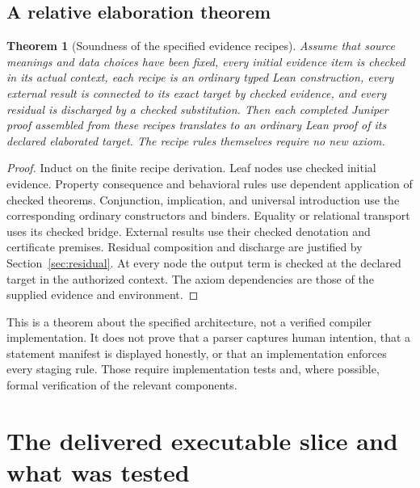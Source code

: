 \documentclass[11pt,a4paper]{article}
\newtheorem{theorem}{Theorem}[section]
\theoremstyle{definition}\newtheorem{definition}[theorem]{Definition}
\theoremstyle{remark}\newtheorem{remark}[theorem]{Remark}
\begin{document}
\subsection{A relative elaboration theorem}
\begin{theorem}[Soundness of the specified evidence recipes]
Assume that source meanings and data choices have been fixed, every initial evidence item is checked in its actual context, each recipe is an ordinary typed Lean construction, every external result is connected to its exact target by checked evidence, and every residual is discharged by a checked substitution. Then each completed Juniper proof assembled from these recipes translates to an ordinary Lean proof of its declared elaborated target. The recipe rules themselves require no new axiom.
\end{theorem}
\begin{proof}
Induct on the finite recipe derivation. Leaf nodes use checked initial evidence. Property consequence and behavioral rules use dependent application of checked theorems. Conjunction, implication, and universal introduction use the corresponding ordinary constructors and binders. Equality or relational transport uses its checked bridge. External results use their checked denotation and certificate premises. Residual composition and discharge are justified by Section~\ref{sec:residual}. At every node the output term is checked at the declared target in the authorized context. The axiom dependencies are those of the supplied evidence and environment.
\end{proof}
This is a theorem about the specified architecture, not a verified compiler implementation. It does not prove that a parser captures human intention, that a statement manifest is displayed honestly, or that an implementation enforces every staging rule. Those require implementation tests and, where possible, formal verification of the relevant components.

\section{The delivered executable slice and what was tested}
\label{sec:prototype}
\end{document}
